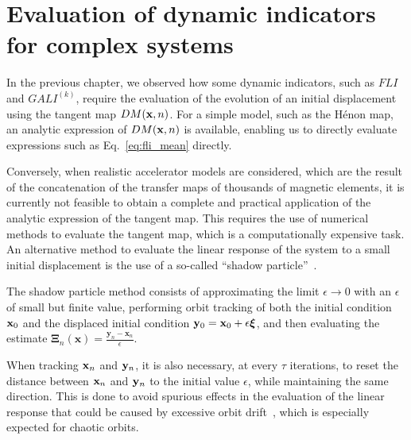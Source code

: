 \section{Evaluation of dynamic indicators for complex systems}\label{sec:8:evaluation}

In the previous chapter, we observed how some dynamic indicators, such as $FLI$ and $GALI^{(k)}$, require the evaluation of the evolution of an initial displacement using the tangent map $DM(\vb{x}, n)$. For a simple model, such as the Hénon map, an analytic expression of $DM(\vb{x}, n)$ is available, enabling us to directly evaluate expressions such as Eq.~\ref{eq:fli_mean} directly.

Conversely, when realistic accelerator models are considered, which are the result of the concatenation of the transfer maps of thousands of magnetic elements, it is currently not feasible to obtain a complete and practical application of the analytic expression of the tangent map. This requires the use of numerical methods to evaluate the tangent map, which is a computationally expensive task. An alternative method to evaluate the linear response of the system to a small initial displacement is the use of a so-called ``shadow particle''~\cite{Skokos2010b}.

The shadow particle method consists of approximating the limit $\epsilon\to 0$ with an $\epsilon$ of small but finite value, performing orbit tracking of both the initial condition $\vb{x}_0$ and the displaced initial condition $\vb{y}_0 = \vb{x}_0 + \epsilon \boldsymbol{\xi}$, and then evaluating the estimate $\boldsymbol{\Xi}_{n}(\mathbf{x})=\frac{\mathbf{y}_{n}-\mathbf{x}_{n}}{\epsilon}$.

When tracking $\vb{x}_n$ and $\vb{y}_n$, it is also necessary, at every $\tau$ iterations, to reset the distance between $\vb{x}_n$ and $\vb{y}_n$ to the initial value $\epsilon$, while maintaining the same direction. This is done to avoid spurious effects in the evaluation of the linear response that could be caused by excessive orbit drift~\cite{Skokos2010b}, which is especially expected for chaotic orbits.

